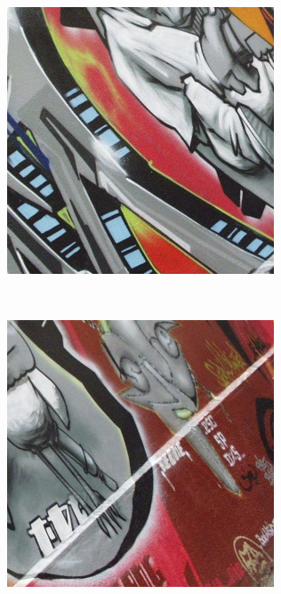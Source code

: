 \documentclass[review]{elsarticle}
\begin{document}
\begin{figure}[htb]
\begin{subfigure}[t]{0.16\columnwidth}
    \end{subfigure}%
    ~~ %
    \begin{subfigure}[t]{0.16\columnwidth}
        \centering
        \includegraphics[width=1\columnwidth]{images/acr/patches/patch_3_2}
    \end{subfigure}%
    ~~ %
    \begin{subfigure}[t]{0.16\columnwidth}
        \centering
        \includegraphics[width=1\columnwidth]{images/acr/patches/patch_4_2}

\end{subfigure}
\end{figure}
\end{document}
